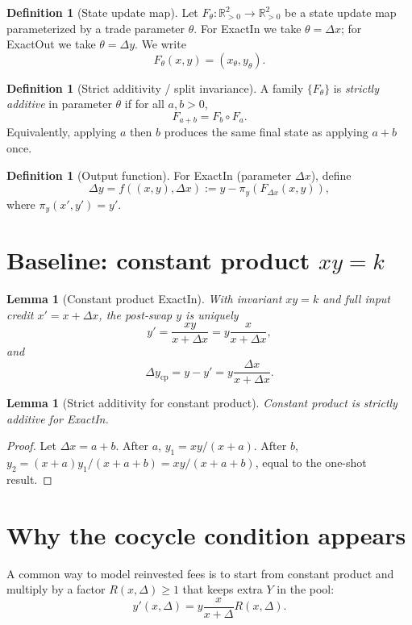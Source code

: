 \documentclass[11pt]{article}
\newtheorem{lemma}[theorem]{Lemma}
\theoremstyle{definition}
\newtheorem{definition}[theorem]{Definition}
\theoremstyle{remark}
\newcommand{\R}{\mathbb{R}}
\newcommand{\Rp}{\R_{>0}}
\newcommand{\dx}{\Delta x}
\newcommand{\dy}{\Delta y}
\newcommand{\projY}{\pi_y}
\begin{document}
\begin{definition}[State update map]
Let $F_\theta:\Rp^2\to\Rp^2$ be a state update map parameterized by a trade parameter $\theta$.
For ExactIn we take $\theta=\dx$; for ExactOut we take $\theta=\dy$.
We write
\[
F_\theta(x,y)=(x_\theta,y_\theta).
\]
\end{definition}

\begin{definition}[Strict additivity / split invariance]
A family $\{F_\theta\}$ is \emph{strictly additive} in parameter $\theta$ if for all $a,b>0$,
\[
F_{a+b} = F_b\circ F_a.
\]
Equivalently, applying $a$ then $b$ produces the same final state as applying $a+b$ once.
\end{definition}

\begin{definition}[Output function]
For ExactIn (parameter $\dx$), define
\[
\Delta y = f((x,y),\dx) := y-\projY(F_{\dx}(x,y)),
\]
where $\projY(x',y')=y'$.
\end{definition}

\section{Baseline: constant product $xy=k$}

\begin{lemma}[Constant product ExactIn]
With invariant $xy=k$ and full input credit $x'=x+\dx$, the post-swap $y$ is uniquely
\[
 y' = \frac{xy}{x+\dx} = y\frac{x}{x+\dx},
\]
and
\[
\Delta y_{\mathrm{cp}} = y-y' = y\frac{\dx}{x+\dx}.
\]
\end{lemma}

\begin{lemma}[Strict additivity for constant product]
Constant product is strictly additive for ExactIn.
\end{lemma}

\begin{proof}
Let $\dx=a+b$. After $a$, $y_1=xy/(x+a)$. After $b$, $y_2=(x+a)y_1/(x+a+b)=xy/(x+a+b)$, equal to the one-shot result.
\end{proof}

\section{Why the cocycle condition appears}

A common way to model reinvested fees is to start from constant product and multiply by a factor $R(x,\Delta)\ge 1$ that keeps extra $Y$ in the pool:
\[
 y'(x,\Delta) = y\frac{x}{x+\Delta}R(x,\Delta).
\]
\end{document}
